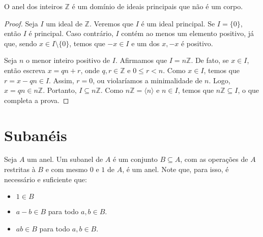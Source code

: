 \begin{prop} O anel dos inteiros $\mathbb Z$ é um domínio de ideais principais que não é um corpo.
\end{prop}
\begin{proof}
    Seja $I$ um ideal de $\mathbb Z$.
    Veremos que $I$ é um ideal principal.
    Se $I=\{0\}$, então $I$ é principal.
    Caso contrário, $I$ contém ao menos um elemento positivo, já que, sendo $x\in I\setminus\{0\}$, temos que $-x \in I$ e um dos $x, -x$ é positivo.

    Seja $n$ o menor inteiro positivo de $I$.
    Afirmamos que $I=n\mathbb Z$.
    De fato, se $x \in I$, então escreva $x=qn+r$, onde $q,r \in \mathbb Z$ e $0\leq r<n$.
    Como $x \in I$, temos que $r=x-qn \in I$. Assim, $r=0$, ou violaríamos a minimalidade de $n$.
    Logo, $x=qn\in n\mathbb Z$.
    Portanto, $I\subseteq n\mathbb Z$.
    Como $n\mathbb Z=\langle n\rangle$ e $n \in I$, temos que $n\mathbb Z\subseteq I$, o que completa a prova.
\end{proof}

\section{Subanéis}
\begin{definition}[Subanel]
    Seja $A$ um anel.
    Um subanel de $A$ é um conjunto $B\subseteq A$, com as operações de $A$ restritas à $B$ e com mesmo $0$ e $1$ de $A$, é um anel.
    Note que, para isso, é necessário e suficiente que:
    
    \begin{itemize}
        \item $1 \in B$
        \item $a-b \in B$ para todo $a, b \in B$.
        \item $ab \in B$ para todo $a, b \in B$.
    \end{itemize}

\end{definition}